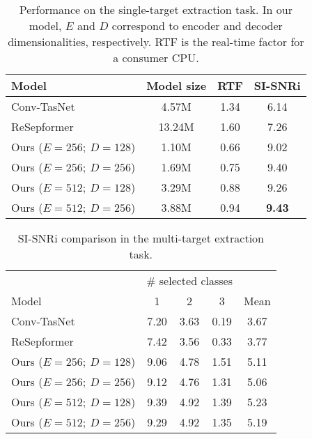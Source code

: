 



\begin{table}
\caption{Performance on the single-target extraction task. In our model, $E$ and $D$ correspond to encoder and decoder dimensionalities, respectively. RTF is the real-time factor for a consumer  CPU.}
\vspace{-.8em}
\centering
\begin{tabular}{lccc}
\toprule
Model                   & Model size & RTF  & SI-SNRi  \\
\midrule
Conv-TasNet              & 4.57M      & 1.34 & 6.14    \\
ReSepformer             & 13.24M     & 1.60 & {7.26}    \\
Ours ($E = 256;~D = 128$) & 1.10M      & 0.66 & 9.02    \\
Ours ($E = 256;~D = 256$) & 1.69M      & 0.75 & 9.40    \\
Ours ($E = 512;~D = 128$) & 3.29M      & 0.88 & 9.26    \\
Ours ($E = 512;~D = 256$) & 3.88M      & 0.94 & \textbf{9.43}    \\
\bottomrule
\end{tabular}
\label{table:single_target}
\end{table}



\begin{table}[t!]
\caption{SI-SNRi  comparison in the multi-target extraction task.}
\vspace{-.8em}
\centering

\begin{tabular}{l  c c c c}
\toprule
 & \multicolumn{3}{c}{\# selected classes} \\
Model                   & 1 & 2  & 3 & Mean \\
\midrule
Conv-TasNet              & 7.20 & 3.63 & 0.19 & 3.67 \\
ReSepformer              & 7.42 & 3.56 & 0.33 & 3.77 \\
Ours ($E = 256;~D = 128$)  & 9.06 & 4.78 & 1.51 & 5.11 \\
Ours ($E = 256;~D = 256$)  & 9.12 & 4.76 & 1.31 & 5.06 \\
Ours ($E = 512;~D = 128$)  & 9.39 & 4.92 & 1.39 & 5.23 \\
Ours ($E = 512;~D = 256$)  & 9.29 & 4.92 & 1.35 & 5.19 \\
\bottomrule
\end{tabular}
\vskip -0.15in
\label{table:multi_target}
\end{table}



